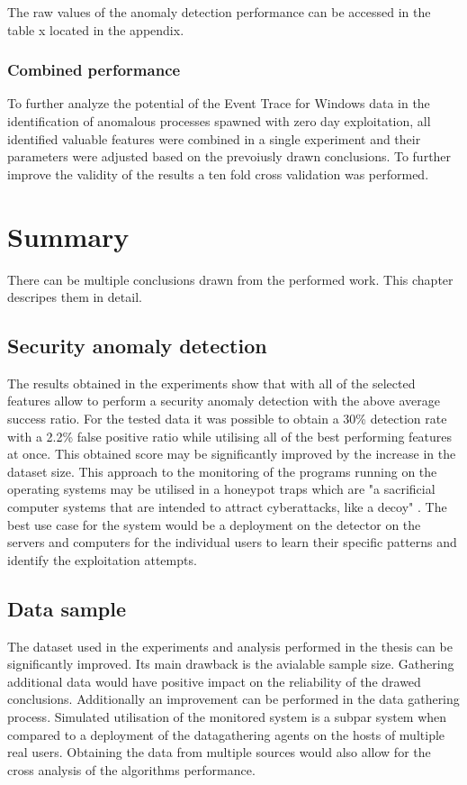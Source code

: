 \documentclass[a4paper,twoside,12pt]{book}
\begin{document}
The raw values of the anomaly detection performance can be accessed in the table x located in the 
appendix. 

\subsection{Combined performance}

To further analyze the potential of the Event Trace for Windows data in the identification of
anomalous processes spawned with zero day exploitation, all identified valuable features were
combined in a single experiment and their parameters were adjusted based on the prevoiusly drawn 
conclusions. To further improve the validity of the results a ten fold cross validation was 
performed. 


\chapter{Summary}

There can be multiple conclusions drawn from the performed work. This chapter descripes them in 
detail.

\section{Security anomaly detection}

The results obtained in the experiments show that with all of the selected features allow 
to perform a security anomaly detection with the above average success ratio. For the tested
data it was possible to obtain a 30\% detection rate with a 2.2\% false positive ratio while
utilising all of the best performing features at once. This obtained score may be significantly 
improved by the increase in the dataset size. This approach to the monitoring of the programs 
running on the operating systems may be utilised in a honeypot traps which are "a sacrificial 
computer systems that are intended to attract cyberattacks, like a decoy" \cite{bib:Honeypot}. 
The best use case for the system would be a deployment on the detector on the servers and 
computers for the individual users to learn their specific patterns and identify the exploitation
attempts.

\section{Data sample}

The dataset used in the experiments and analysis performed in the thesis can be significantly 
improved. Its main drawback is the avialable sample size. Gathering additional data would have
positive impact on the reliability of the drawed conclusions. Additionally an improvement 
can be performed in the data gathering process. Simulated utilisation of the monitored system
is a subpar system when compared to a deployment of the datagathering agents on the hosts of 
multiple real users. Obtaining the data from multiple sources would also allow for the cross
analysis of the algorithms performance. 
\end{document}
